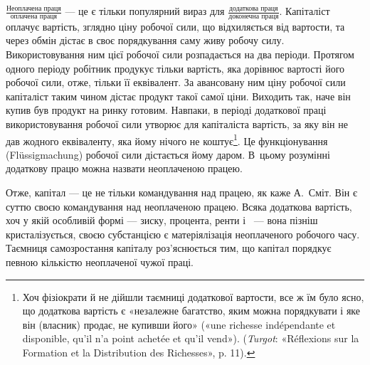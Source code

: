 \parcont{}  %
$\frac{\text{Неоплачена праця}}{\text{оплачена праця}}$ — це є тільки популярний вираз для
$\frac{\text{додаткова праця}}{\text{доконечна праця}}$. Капіталіст оплачує вартість, зглядно ціну
робочої сили, що відхиляється від вартости, та через обмін дістає в своє порядкування саму живу
робочу силу. Використовування ним цієї робочої сили розпадається на два періоди. Протягом одного
періоду робітник продукує тільки вартість,
яка дорівнює вартості його робочої сили, отже, тільки її еквівалент.
За авансовану ним ціну робочої сили капіталіст таким
чином дістає продукт такої самої ціни. Виходить так, наче він
купив був продукт на ринку готовим. Навпаки, в періоді додаткової
праці використовування робочої сили утворює для капіталіста
вартість, за яку він не дав жодного еквіваленту, яка
йому нічого не коштує\footnote{
Хоч фізіократи й не дійшли таємниці додаткової вартости, все ж
їм було ясно, що додаткова вартість є «незалежне багатство, яким можна
порядкувати і яке він (власник) продає, не купивши його» («une richesse
indépendante et disponible, qu’il n’a point achetée et qu'il vend»). (\emph{Turgot}:
«Réflexions sur la Formation et la Distribution des Richesses», p. 11).
}. Це функціонування (Flüssigmachung)
робочої сили дістається йому даром. В~цьому розумінні додаткову
працю можна назвати неоплаченою працею.

Отже, капітал — це не тільки командування над працею,
як каже А.~Сміт. Він є суттю своєю командування над неоплаченою
працею. Всяка додаткова вартість, хоч у якій особливій
формі — зиску, процента, ренти і~ — вона пізніш кристалізується,
своєю субстанцією є матеріялізація неоплаченого робочого
часу. Таємниця самозростання капіталу роз’яснюється тим,
що капітал порядкує певною кількістю неоплаченої чужої праці.
